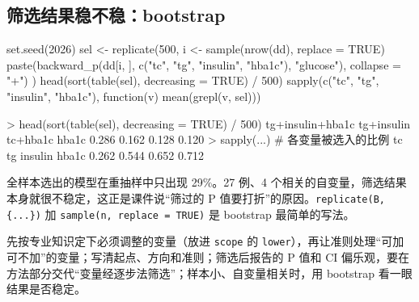 \subsection{筛选结果稳不稳：bootstrap}
\begin{RCode}
set.seed(2026)
sel <- replicate(500, {
  i <- sample(nrow(dd), replace = TRUE)
  paste(backward_p(dd[i, ], c("tc", "tg", "insulin", "hba1c"), "glucose"), collapse = "+")
})
head(sort(table(sel), decreasing = TRUE) / 500)
sapply(c("tc", "tg", "insulin", "hba1c"), function(v) mean(grepl(v, sel)))
\end{RCode}
\begin{ROut}
> head(sort(table(sel), decreasing = TRUE) / 500)
   tg+insulin+hba1c          tg+insulin            tc+hba1c               hba1c
              0.286               0.162               0.128               0.120
> sapply(...)           # 各变量被选入的比例
     tc      tg insulin   hba1c
  0.262   0.544   0.652   0.712
\end{ROut}
全样本选出的模型在重抽样中只出现 29\%。27 例、4 个相关的自变量，筛选结果本身就很不稳定，这正是课件说“筛过的 P 值要打折”的原因。\Verb|replicate(B, {...})| 加 \Verb|sample(n, replace = TRUE)| 是 bootstrap 最简单的写法。

\begin{notebox}[筛选的几条规矩]
先按专业知识定下必须调整的变量（放进 \Verb|scope| 的 \Verb|lower|），再让准则处理“可加可不加”的变量；写清起点、方向和准则；筛选后报告的 P 值和 CI 偏乐观，要在方法部分交代“变量经逐步法筛选”；样本小、自变量相关时，用 bootstrap 看一眼结果是否稳定。
\end{notebox}
